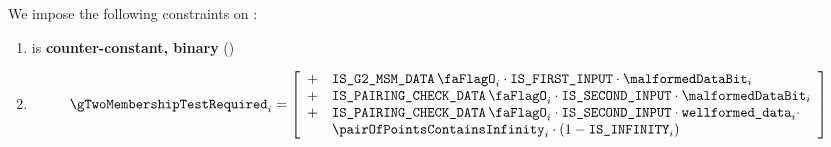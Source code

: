 \noindent
We impose the following constraints on \gTwoMembershipTestRequired{}:
\begin{enumerate}
    \item \gTwoMembershipTestRequired{} is \textbf{counter-constant, binary} \quad (\trash)
    \item 
        \[
            \gTwoMembershipTestRequired_{i} = 
                \left[ \begin{array}{cl} 
                    + & \isBlsGTwoMsmData_{i} \cdot \isFirstInput \cdot \malformedDataBit_{i}  \\
                    + & \isBlsPairingCheckData_{i} \cdot \isSecondInput \cdot \malformedDataBit_{i} \\
                    + & \isBlsPairingCheckData_{i} \cdot \isSecondInput \cdot \locWellformedData_{i} \cdot \\
                    & \pairOfPointsContainsInfinity_{i} \cdot (1 - \isInfinity_{i}) \\
                \end{array} \right] \\
        \]
\end{enumerate}

